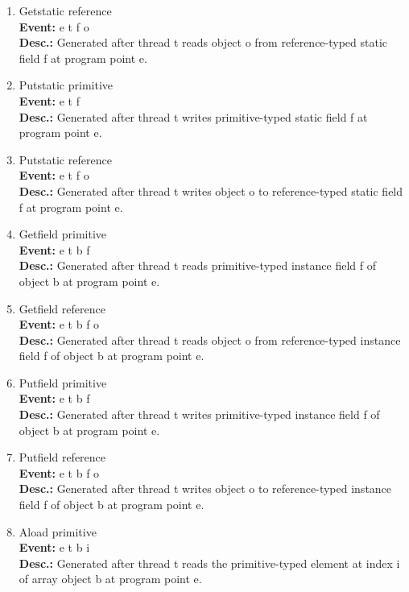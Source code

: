 \begin{enumerate}
\item
Getstatic reference \\
{\bf Event:}  e t f o \\
{\bf Desc.:} Generated after thread t reads object o from reference-typed static field f at program point e.

\item
Putstatic primitive \\
{\bf Event:}  e t f \\
{\bf Desc.:} Generated after thread t writes primitive-typed static field f at program point e.

\item
Putstatic reference \\
{\bf Event:}  e t f o \\
{\bf Desc.:} Generated after thread t writes object o to reference-typed static field f at program point e.

\item
Getfield primitive \\
{\bf Event:}  e t b f \\
{\bf Desc.:} Generated after thread t reads primitive-typed instance field f of object b at program point e.

\item
Getfield reference \\
{\bf Event:}  e t b f o \\
{\bf Desc.:} Generated after thread t reads object o from reference-typed instance field f of object b at program point e.

\item
Putfield primitive \\
{\bf Event:}  e t b f \\
{\bf Desc.:} Generated after thread t writes primitive-typed instance field f of object b at program point e.

\item
Putfield reference \\
{\bf Event:}  e t b f o \\
{\bf Desc.:} Generated after thread t writes object o to reference-typed instance field f of object b at program point e.

\item
Aload primitive \\
{\bf Event:}  e t b i \\
{\bf Desc.:} Generated after thread t reads the primitive-typed element at index i of array object b at program point e.


\end{enumerate}
